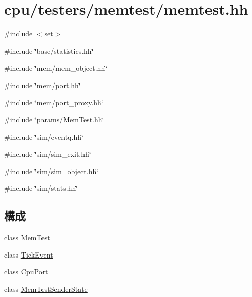 \hypertarget{memtest_8hh}{
\section{cpu/testers/memtest/memtest.hh}
\label{memtest_8hh}
}
{\ttfamily \#include $<$set$>$}\par
{\ttfamily \#include \char`\"{}base/statistics.hh\char`\"{}}\par
{\ttfamily \#include \char`\"{}mem/mem\_\-object.hh\char`\"{}}\par
{\ttfamily \#include \char`\"{}mem/port.hh\char`\"{}}\par
{\ttfamily \#include \char`\"{}mem/port\_\-proxy.hh\char`\"{}}\par
{\ttfamily \#include \char`\"{}params/MemTest.hh\char`\"{}}\par
{\ttfamily \#include \char`\"{}sim/eventq.hh\char`\"{}}\par
{\ttfamily \#include \char`\"{}sim/sim\_\-exit.hh\char`\"{}}\par
{\ttfamily \#include \char`\"{}sim/sim\_\-object.hh\char`\"{}}\par
{\ttfamily \#include \char`\"{}sim/stats.hh\char`\"{}}\par
\subsection*{構成}
\begin{DoxyCompactItemize}
\item 
class \hyperlink{classMemTest}{MemTest}
\item 
class \hyperlink{classMemTest_1_1TickEvent}{TickEvent}
\item 
class \hyperlink{classMemTest_1_1CpuPort}{CpuPort}
\item 
class \hyperlink{classMemTest_1_1MemTestSenderState}{MemTestSenderState}
\end{DoxyCompactItemize}
